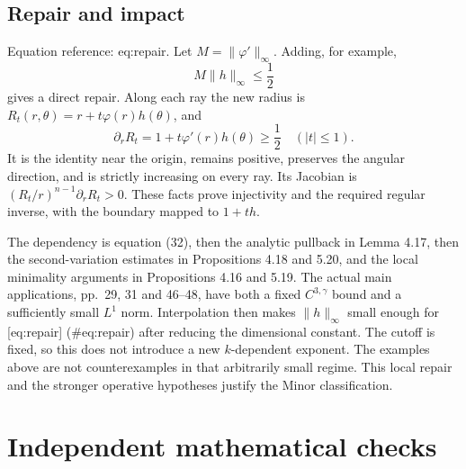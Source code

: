 \documentclass[10pt]{article}
\begin{document}
\subsection*{Repair and impact}
Equation reference: eq:repair. Let \(M=\|\varphi'\|_\infty\). Adding, for example, \[
 M\|h\|_\infty\leq\frac12\] gives a direct repair. Along each ray the new radius is \(R_t(r,\theta)=r+t\varphi(r)h(\theta)\), and \[\partial_rR_t=1+t\varphi'(r)h(\theta)\geq\frac12
 \quad (|t|\leq1).\] It is the identity near the origin, remains positive, preserves the angular direction, and is strictly increasing on every ray. Its Jacobian is \((R_t/r)^{n-1}\partial_rR_t>0\). These facts prove injectivity and the required regular inverse, with the boundary mapped to \(1+th\).\par
The dependency is equation (32), then the analytic pullback in Lemma 4.17, then the second-variation estimates in Propositions 4.18 and 5.20, and the local minimality arguments in Propositions 4.16 and 5.19. The actual main applications, pp. 29, 31 and 46–48, have both a fixed \(C^{3,\gamma}\) bound and a sufficiently small \(L^1\) norm. Interpolation then makes \(\|h\|_\infty\) small enough for [eq:repair] (\#eq:repair) after reducing the dimensional constant. The cutoff is fixed, so this does not introduce a new \(k\)-dependent exponent. The examples above are not counterexamples in that arbitrarily small regime. This local repair and the stronger operative hypotheses justify the Minor classification.\par
\section*{Independent mathematical checks}
\end{document}
